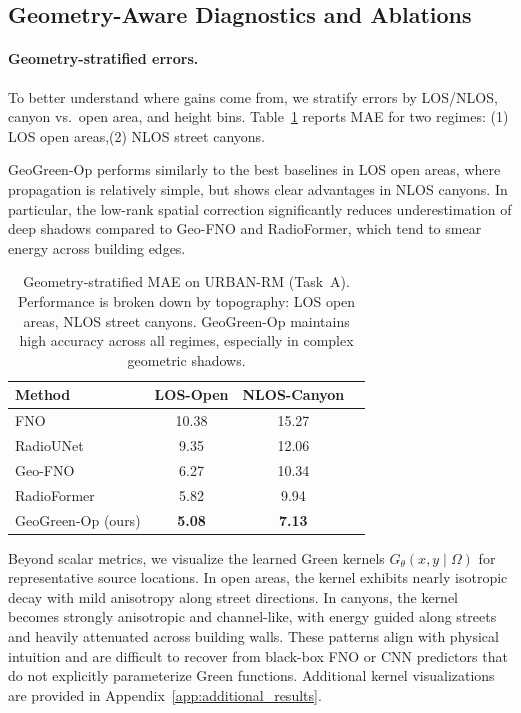 \documentclass{article}
\begin{document}
\subsection{Geometry-Aware Diagnostics and Ablations}
\label{sec:exp_diagnostics}

\paragraph{Geometry-stratified errors.}
To better understand where gains come from, we stratify errors by
LOS/NLOS, canyon vs.\ open area, and height bins.
Table~\ref{tab:geom_stratified} reports MAE for two regimes:
(1) LOS open areas,(2) NLOS street canyons.

GeoGreen-Op performs similarly to the best baselines in LOS open
areas, where propagation is relatively simple, but shows clear
advantages in NLOS canyons.
In particular, the low-rank spatial correction significantly reduces
underestimation of deep shadows compared to Geo-FNO and RadioFormer,
which tend to smear energy across building edges.

\begin{table}[t]
\small
\caption{Geometry-stratified MAE on URBAN-RM (Task~A). Performance is broken down by topography: LOS open areas, NLOS street canyons. GeoGreen-Op maintains high accuracy across all regimes, especially in complex geometric shadows.}
\label{tab:geom_stratified}
\centering
\begin{tabular}{lccc}
\toprule
Method & LOS-Open & NLOS-Canyon  \\
\midrule
FNO         & 10.38 & 15.27  \\
RadioUNet   & 9.35  & 12.06  \\
Geo-FNO     & 6.27  & 10.34  \\
RadioFormer & 5.82  & 9.94  \\
\midrule
GeoGreen-Op (ours) & \textbf{5.08} & \textbf{7.13} \\
\bottomrule
\end{tabular}
\end{table}


Beyond scalar metrics, we visualize the learned Green kernels
$G_\theta(x, y \mid \Omega)$ for representative source locations.
In open areas, the kernel exhibits nearly isotropic decay with mild
anisotropy along street directions.
In canyons, the kernel becomes strongly anisotropic and channel-like,
with energy guided along streets and heavily attenuated across
building walls.
These patterns align with physical intuition and are difficult to
recover from black-box FNO or CNN predictors that do not explicitly
parameterize Green functions.
Additional kernel visualizations are provided in
Appendix~\ref{app:additional_results}.
\end{document}
